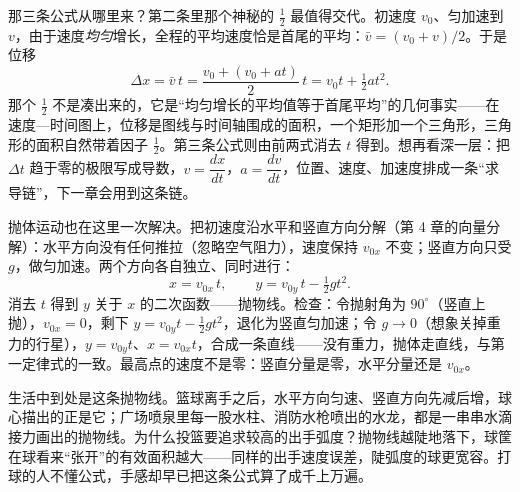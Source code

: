 \begin{mathbridge}
那三条公式从哪里来？第二条里那个神秘的 \(\tfrac12\) 最值得交代。初速度 \(v_0\)、匀加速到 \(v\)，由于速度\emph{均匀}增长，全程的平均速度恰是首尾的平均：\(\bar v=(v_0+v)/2\)。于是位移
\[
  \Delta x=\bar v\,t=\frac{v_0+(v_0+at)}{2}\,t=v_0 t+\tfrac12 a t^2.
\]
那个 \(\tfrac12\) 不是凑出来的，它是“均匀增长的平均值等于首尾平均”的几何事实——在速度—时间图上，位移是图线与时间轴围成的面积，一个矩形加一个三角形，三角形的面积自然带着因子 \(\tfrac12\)。第三条公式则由前两式消去 \(t\) 得到。想再看深一层：把 \(\Delta t\) 趋于零的极限写成导数，\(v=\dfrac{dx}{dt}\)，\(a=\dfrac{dv}{dt}\)，位置、速度、加速度排成一条“求导链”，下一章会用到这条链。

抛体运动也在这里一次解决。把初速度沿水平和竖直方向分解（第 4 章的向量分解）：水平方向没有任何推拉（忽略空气阻力），速度保持 \(v_{0x}\) 不变；竖直方向只受 \(g\)，做匀加速。两个方向各自独立、同时进行：
\[
  x=v_{0x}\,t,\qquad y=v_{0y}\,t-\tfrac12 g t^2.
\]
消去 \(t\) 得到 \(y\) 关于 \(x\) 的二次函数——抛物线。检查：令抛射角为 \(90^\circ\)（竖直上抛），\(v_{0x}=0\)，剩下 \(y=v_{0y}t-\tfrac12gt^2\)，退化为竖直匀加速；令 \(g\to0\)（想象关掉重力的行星），\(y=v_{0y}t\)、\(x=v_{0x}t\)，合成一条直线——没有重力，抛体走直线，与第一定律式的一致。最高点的速度不是零：竖直分量是零，水平分量还是 \(v_{0x}\)。

生活中到处是这条抛物线。篮球离手之后，水平方向匀速、竖直方向先减后增，球心描出的正是它；广场喷泉里每一股水柱、消防水枪喷出的水龙，都是一串串水滴接力画出的抛物线。为什么投篮要追求较高的出手弧度？抛物线越陡地落下，球筐在球看来“张开”的有效面积越大——同样的出手速度误差，陡弧度的球更宽容。打球的人不懂公式，手感却早已把这条公式算了成千上万遍。
\end{mathbridge}

\begin{center}
\end{center}

